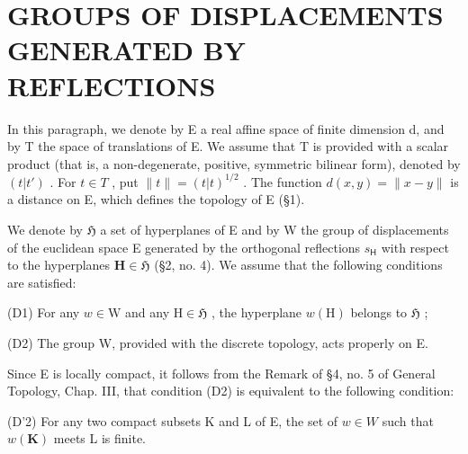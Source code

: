 \section{GROUPS OF DISPLACEMENTS GENERATED BY REFLECTIONS}

In this paragraph, we denote by E a real affine space of finite dimension d, and by T the space of translations of E. We assume that T is provided with a scalar product (that is, a non-degenerate, positive, symmetric bilinear form), denoted by \((t|t')\) . For \(t \in T\) , put \(\|t\| = (t|t)^{1/2}\) . The function \(d(x, y) = \|x - y\|\) is a distance on E, which defines the topology of E (§1).

We denote by \(\mathfrak{H}\) a set of hyperplanes of E and by W the group of displacements of the euclidean space E generated by the orthogonal reflections \(s_{\mathsf{H}}\) with respect to the hyperplanes \(\mathbf{H} \in \mathfrak{H}\) (§2, no. 4). We assume that the following conditions are satisfied:

(D1) For any \(w \in \mathrm{W}\) and any \(\mathrm{H} \in \mathfrak{H}\) , the hyperplane \(w(\mathrm{H})\) belongs to \(\mathfrak{H}\) ;

(D2) The group W, provided with the discrete topology, acts properly on E.

Since E is locally compact, it follows from the Remark of §4, no. 5 of General Topology, Chap. III, that condition (D2) is equivalent to the following condition:

(D'2) For any two compact subsets K and L of E, the set of \(w \in W\) such that \(w(\mathbf{K})\) meets L is finite.

